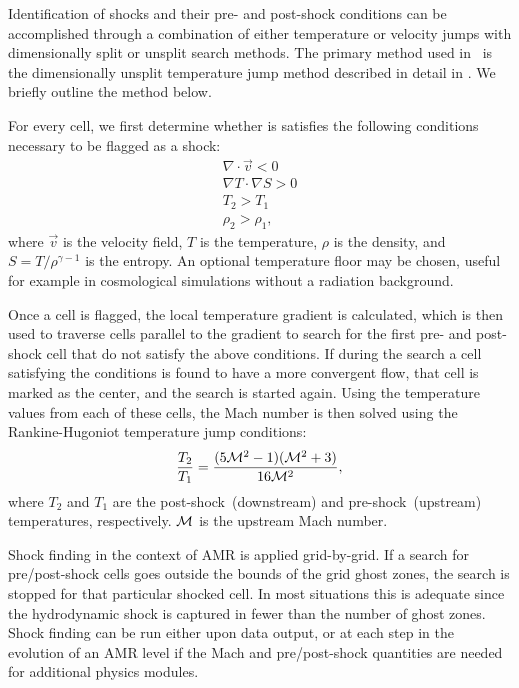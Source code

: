 Identification of shocks and their pre- and post-shock conditions can be
accomplished through a combination of either temperature or velocity jumps with
dimensionally split or unsplit search methods.  The primary method used in
\enzo~is the dimensionally unsplit temperature jump method described in detail
in \citet{2008ApJ...689.1063S}.  We briefly outline the method below.

For every cell, we first determine whether is satisfies the following conditions
necessary to be flagged as a shock:
\begin{eqnarray}
\nabla \cdot \vec{v} < 0 \\
\nabla T \cdot \nabla S > 0\\
T_2 > T_1 \\
\rho_2 > \rho_1,
\end{eqnarray}
where $\vec{v}$ is the velocity field, $T$ is the temperature, $\rho$ is the
density, and $S=T/\rho^{\gamma-1}$ is the entropy.  An optional temperature floor
may be chosen, useful for example in cosmological simulations without a radiation
background.

Once a cell is flagged, the local temperature gradient is calculated, which is 
then used to traverse cells parallel to the gradient to search for the first
pre- and post-shock cell that do not satisfy the above conditions.  If during
the search a cell satisfying the conditions is found to have a more convergent
flow, that cell is marked as the center, and the search is started again. Using the 
temperature values from each of these cells, the Mach number is then solved
using the Rankine-Hugoniot temperature jump conditions:
\begin{equation}
\frac{T_2}{T_1} = \frac{(5\Mach^2 - 1)(\Mach^2 + 3)}{16\Mach^2},
\end{equation}
where $T_2$ and $T_1$ are the post-shock~(downstream) and pre-shock~(upstream)
temperatures, respectively. $\mathcal{M}$ is the upstream Mach number.  

Shock finding in the context of AMR is applied grid-by-grid.  If a search for
pre/post-shock cells goes outside the bounds of the grid ghost zones, the
search is stopped for that particular shocked cell. In most situations this is
adequate since the hydrodynamic shock is captured in fewer than the number of
ghost zones.  Shock finding can be run either upon data output, or at each step
in the evolution of an AMR level if the Mach and pre/post-shock quantities are
needed for additional physics modules.

